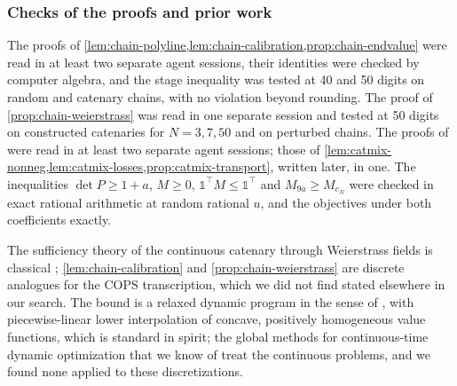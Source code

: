 \subsubsection{Checks of the proofs and prior work}\label{app:chain-prior}

The proofs of \cref{lem:chain-polyline,lem:chain-calibration,prop:chain-endvalue} were read in at least two separate agent sessions, their identities were checked by computer algebra, and the stage inequality was tested at 40 and 50 digits on random and catenary chains, with no violation beyond rounding.
The proof of \cref{prop:chain-weierstrass} was read in one separate session and tested at 50 digits on constructed catenaries for $N = 3, 7, 50$ and on perturbed chains.
The proofs of  were read in at least two separate agent sessions; those of \cref{lem:catmix-nonneg,lem:catmix-losses,prop:catmix-transport}, written later, in one.
The inequalities $\det P \ge 1+a$, $M \ge 0$, $\mathbb{1}^\top M \le \mathbb{1}^\top$ and $M_{9a} \ge M_{c_N}$ were checked in exact rational arithmetic at random rational $u$, and the objectives under both coefficients exactly.

The sufficiency theory of the continuous catenary through Weierstrass fields is classical \citep[see][for a discussion and a variant]{denzler1999-catenaria-verathe-true-catenary}; \cref{lem:chain-calibration} and \cref{prop:chain-weierstrass} are discrete analogues for the COPS transcription, which we did not find stated elsewhere in our search.
The  bound is a relaxed dynamic program in the sense of \citet{lincoln2006-relaxing-dynamic-programming}, with piecewise-linear lower interpolation of concave, positively homogeneous value functions, which is standard in spirit; the global methods for continuous-time dynamic optimization that we know of \citep[for example][]{chachuat2005-global-mixed-integer-dynamic-optimization} treat the continuous problems, and we found none applied to these discretizations.
